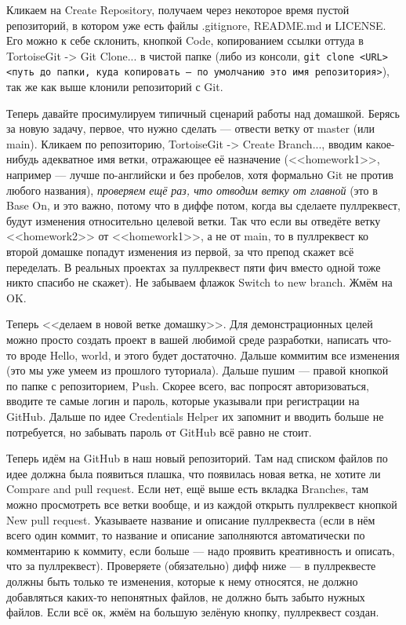 \documentclass{../text-style}
\begin{document}
Кликаем на Create Repository, получаем через некоторое время пустой репозиторий, в котором уже есть файлы .gitignore, README.md и LICENSE. Его можно к себе склонить, кнопкой Code, копированием ссылки оттуда в TortoiseGit -> Git Clone... в чистой папке (либо из консоли, \verb|git clone <URL> <путь до папки, куда копировать — по умолчанию это имя репозитория>|), так же как выше клонили репозиторий с Git.

Теперь давайте просимулируем типичный сценарий работы над домашкой. Берясь за новую задачу, первое, что нужно сделать --- отвести ветку от master (или main). Кликаем по репозиторию, TortoiseGit -> Create Branch..., вводим какое-нибудь адекватное имя ветки, отражающее её назначение (<<homework1>>, например --- лучше по-английски и без пробелов, хотя формально Git не против любого названия), \emph{проверяем ещё раз, что отводим ветку от главной} (это в Base On, и это важно, потому что в диффе потом, когда вы сделаете пуллреквест, будут изменения относительно целевой ветки. Так что если вы отведёте ветку <<homework2>> от <<homework1>>, а не от main, то в пуллреквест ко второй домашке попадут изменения из первой, за что препод скажет всё переделать. В реальных проектах за пуллреквест пяти фич вместо одной тоже никто спасибо не скажет). Не забываем флажок Switch to new branch. Жмём на OK.

Теперь <<делаем в новой ветке домашку>>. Для демонстрационных целей можно просто создать проект в вашей любимой среде разработки, написать что-то вроде Hello, world, и этого будет достаточно. Дальше коммитим все изменения (это мы уже умеем из прошлого туториала). Дальше пушим --- правой кнопкой по папке с репозиторием, Push. Скорее всего, вас попросят авторизоваться, вводите те самые логин и пароль, которые указывали при регистрации на GitHub. Дальше по идее Credentials Helper их запомнит и вводить больше не потребуется, но забывать пароль от GitHub всё равно не стоит.

Теперь идём на GitHub в наш новый репозиторий. Там над списком файлов по идее должна была появиться плашка, что появилась новая ветка, не хотите ли Compare and pull request. Если нет, ещё выше есть вкладка Branches, там можно просмотреть все ветки вообще, и из каждой открыть пуллреквест кнопкой New pull request. Указываете название и описание пуллреквеста (если в нём всего один коммит, то название и описание заполняются автоматически по комментарию к коммиту, если больше --- надо проявить креативность и описать, что за пуллреквест). Проверяете (обязательно) дифф ниже --- в пуллреквесте должны быть только те изменения, которые к нему относятся, не должно добавляться каких-то непонятных файлов, не должно быть забыто нужных файлов. Если всё ок, жмём на большую зелёную кнопку, пуллреквест создан.
\end{document}
